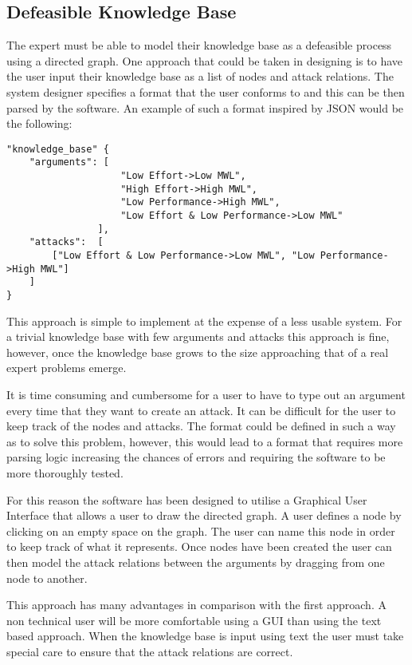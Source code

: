 \subsection{Defeasible Knowledge Base}
The expert must be able to model their knowledge base as a defeasible process using a directed graph. One approach that could be taken in designing is to have the user input their knowledge base as a list of nodes and attack relations. The system designer specifies a format that the user conforms to and this can be then parsed by the software. An example of such a format inspired by JSON would be the following:

\begin{lstlisting}
"knowledge_base" {
    "arguments": [
                    "Low Effort->Low MWL", 
                    "High Effort->High MWL", 
                    "Low Performance->High MWL", 
                    "Low Effort & Low Performance->Low MWL"
                ],
    "attacks":  [
        ["Low Effort & Low Performance->Low MWL", "Low Performance->High MWL"]
    ]
}
\end{lstlisting}

This approach is simple to implement at the expense of a less usable system. For a trivial knowledge base with few arguments and attacks this approach is fine, however, once the knowledge base grows to the size approaching that of a real expert problems emerge.

It is time consuming and cumbersome for a user to have to type out an argument every time that they want to create an attack. It can be difficult for the user to keep track of the nodes and attacks. The format could be defined in such a way as to solve this problem, however, this would lead to a format that requires more parsing logic increasing the chances of errors and requiring the software to be more thoroughly tested.

For this reason the software has been designed to utilise a Graphical User Interface that allows a user to draw the directed graph. A user defines a node by clicking on an empty space on the graph. The user can name this node in order to keep track of what it represents. Once nodes have been created the user can then model the attack relations between the arguments by dragging from one node to another.

This approach has many advantages in comparison with the first approach. A non technical user will be more comfortable using a GUI than using the text based approach. When the knowledge base is input using text the user must take special care to ensure that the attack relations are correct.

